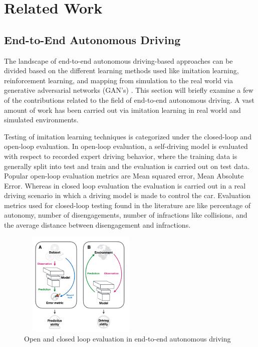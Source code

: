 

    \chapter{Related Work}


    \section{End-to-End Autonomous Driving}
   The landscape of end-to-end autonomous driving-based approaches can be divided based on the different learning methods used like imitation learning, reinforcement learning, and mapping from simulation to the real world via generative adversarial networks (GAN's) .
This section will briefly examine a few of the contributions related to the field of end-to-end autonomous driving. A vast amount of work has been carried out via imitation learning in real world and simulated environments. 
\par Testing of imitation learning techniques is categorized under the closed-loop and open-loop evaluation. In open-loop evaluation, a self-driving model is evaluated with respect to recorded expert driving behavior, where the training data is generally split into test and train and the evaluation is carried out on test data. Popular open-loop evaluation metrics are Mean squared error, Mean Absolute Error. Whereas in closed loop evaluation the evaluation is carried out in a real driving scenario in which a driving model is made to control the car. Evaluation metrics used for closed-loop testing found in the literature are like percentage of autonomy, number of disengagements, number of infractions like collisions, and the average distance between disengagement and infractions.

 \begin{figure}[h]
    \centering
    \includegraphics[width=6cm, height=5cm]{images/open_closed.png}
    \caption{\cite{DBLP:journals/corr/abs-2003-06404} Open and closed loop evaluation  in end-to-end autonomous driving }
    \end{figure}

